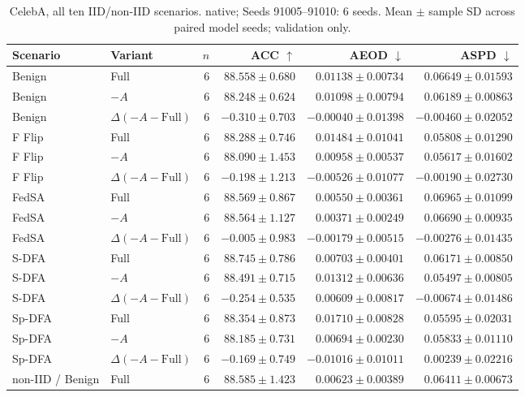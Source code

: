 \begin{table}[t]
\centering
\small
\caption{CelebA, all ten IID/non-IID scenarios. native; Seeds 91005–91010: 6 seeds. Mean $\pm$ sample SD across paired model seeds; validation only.}
\begin{tabular}{llrrrr}
\toprule
Scenario & Variant & $n$ & ACC $\uparrow$ & AEOD $\downarrow$ & ASPD $\downarrow$ \\
\midrule
Benign & Full & 6 & $88.558 \pm 0.680$ & $0.01138 \pm 0.00734$ & $0.06649 \pm 0.01593$ \\
Benign & $-A$ & 6 & $88.248 \pm 0.624$ & $0.01098 \pm 0.00794$ & $0.06189 \pm 0.00863$ \\
Benign & $\Delta(-A-\mathrm{Full})$ & 6 & $-0.310 \pm 0.703$ & $-0.00040 \pm 0.01398$ & $-0.00460 \pm 0.02052$ \\
F Flip & Full & 6 & $88.288 \pm 0.746$ & $0.01484 \pm 0.01041$ & $0.05808 \pm 0.01290$ \\
F Flip & $-A$ & 6 & $88.090 \pm 1.453$ & $0.00958 \pm 0.00537$ & $0.05617 \pm 0.01602$ \\
F Flip & $\Delta(-A-\mathrm{Full})$ & 6 & $-0.198 \pm 1.213$ & $-0.00526 \pm 0.01077$ & $-0.00190 \pm 0.02730$ \\
FedSA & Full & 6 & $88.569 \pm 0.867$ & $0.00550 \pm 0.00361$ & $0.06965 \pm 0.01099$ \\
FedSA & $-A$ & 6 & $88.564 \pm 1.127$ & $0.00371 \pm 0.00249$ & $0.06690 \pm 0.00935$ \\
FedSA & $\Delta(-A-\mathrm{Full})$ & 6 & $-0.005 \pm 0.983$ & $-0.00179 \pm 0.00515$ & $-0.00276 \pm 0.01435$ \\
S-DFA & Full & 6 & $88.745 \pm 0.786$ & $0.00703 \pm 0.00401$ & $0.06171 \pm 0.00850$ \\
S-DFA & $-A$ & 6 & $88.491 \pm 0.715$ & $0.01312 \pm 0.00636$ & $0.05497 \pm 0.00805$ \\
S-DFA & $\Delta(-A-\mathrm{Full})$ & 6 & $-0.254 \pm 0.535$ & $0.00609 \pm 0.00817$ & $-0.00674 \pm 0.01486$ \\
Sp-DFA & Full & 6 & $88.354 \pm 0.873$ & $0.01710 \pm 0.00828$ & $0.05595 \pm 0.02031$ \\
Sp-DFA & $-A$ & 6 & $88.185 \pm 0.731$ & $0.00694 \pm 0.00230$ & $0.05833 \pm 0.01110$ \\
Sp-DFA & $\Delta(-A-\mathrm{Full})$ & 6 & $-0.169 \pm 0.749$ & $-0.01016 \pm 0.01011$ & $0.00239 \pm 0.02216$ \\
non-IID / Benign & Full & 6 & $88.585 \pm 1.423$ & $0.00623 \pm 0.00389$ & $0.06411 \pm 0.00673$ \\

\end{tabular}
\end{table}
